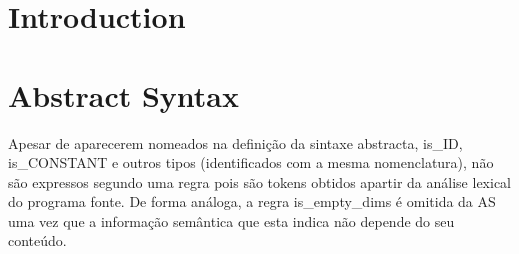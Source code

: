 \documentclass[a4paper]{article}
\title{\documentTitle}
\author{\documentAuthors{}}
\begin{document}
\renewcommand{\figurename}{Figure}
\maketitle
\cleardoublepage

\tableofcontents
\cleardoublepage

\setlength{\parindent}{1cm}
\setlength{\parskip}{0.3cm}

\section{Introduction}
\section{Abstract Syntax}
\indent \indent Apesar de aparecerem nomeados na definição da sintaxe abstracta, 
is\_ID, is\_CONSTANT e outros tipos (identificados com a mesma nomenclatura),
não são expressos segundo uma regra pois são tokens obtidos apartir da análise lexical do programa fonte.
De forma análoga, a regra is\_empty\_dims é omitida da AS uma vez que a informação semântica que esta indica não depende do seu conteúdo.
\end{document}
